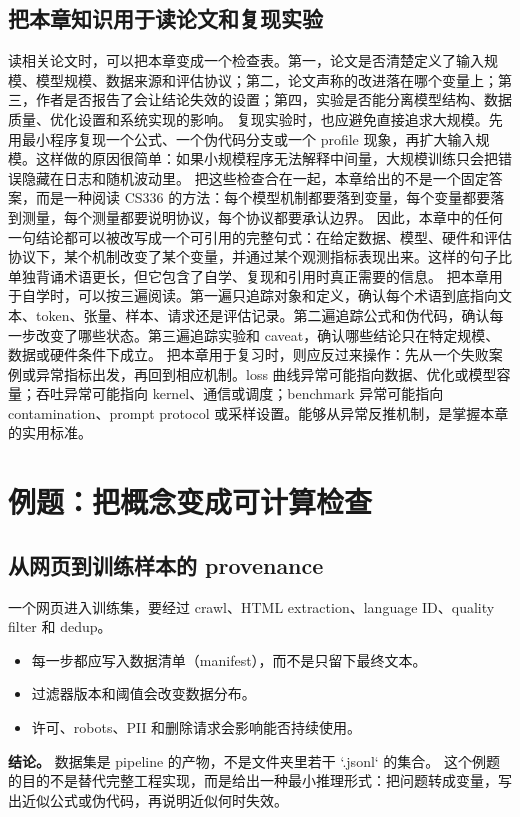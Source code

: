 \documentclass[a4paper]{article}
\begin{document}
\subsection{把本章知识用于读论文和复现实验}
读相关论文时，可以把本章变成一个检查表。第一，论文是否清楚定义了输入规模、模型规模、数据来源和评估协议；第二，论文声称的改进落在哪个变量上；第三，作者是否报告了会让结论失效的设置；第四，实验是否能分离模型结构、数据质量、优化设置和系统实现的影响。
复现实验时，也应避免直接追求大规模。先用最小程序复现一个公式、一个伪代码分支或一个 profile 现象，再扩大输入规模。这样做的原因很简单：如果小规模程序无法解释中间量，大规模训练只会把错误隐藏在日志和随机波动里。
把这些检查合在一起，本章给出的不是一个固定答案，而是一种阅读 CS336 的方法：每个模型机制都要落到变量，每个变量都要落到测量，每个测量都要说明协议，每个协议都要承认边界。
因此，本章中的任何一句结论都可以被改写成一个可引用的完整句式：在给定数据、模型、硬件和评估协议下，某个机制改变了某个变量，并通过某个观测指标表现出来。这样的句子比单独背诵术语更长，但它包含了自学、复现和引用时真正需要的信息。
把本章用于自学时，可以按三遍阅读。第一遍只追踪对象和定义，确认每个术语到底指向文本、token、张量、样本、请求还是评估记录。第二遍追踪公式和伪代码，确认每一步改变了哪些状态。第三遍追踪实验和 caveat，确认哪些结论只在特定规模、数据或硬件条件下成立。
把本章用于复习时，则应反过来操作：先从一个失败案例或异常指标出发，再回到相应机制。loss 曲线异常可能指向数据、优化或模型容量；吞吐异常可能指向 kernel、通信或调度；benchmark 异常可能指向 contamination、prompt protocol 或采样设置。能够从异常反推机制，是掌握本章的实用标准。
\section{例题：把概念变成可计算检查}
\subsection{从网页到训练样本的 provenance}
一个网页进入训练集，要经过 crawl、HTML extraction、language ID、quality filter 和 dedup。
\begin{itemize}
\item 每一步都应写入数据清单（manifest），而不是只留下最终文本。
\item 过滤器版本和阈值会改变数据分布。
\item 许可、robots、PII 和删除请求会影响能否持续使用。
\end{itemize}
\textbf{结论。} 数据集是 pipeline 的产物，不是文件夹里若干 `.jsonl` 的集合。
这个例题的目的不是替代完整工程实现，而是给出一种最小推理形式：把问题转成变量，写出近似公式或伪代码，再说明近似何时失效。
\end{document}
